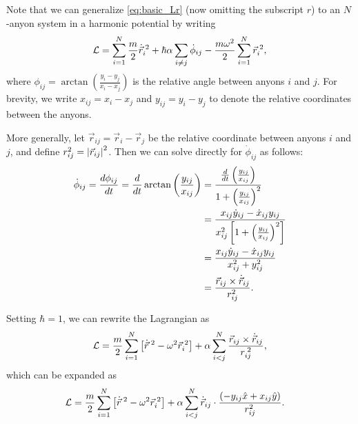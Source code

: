 Note that we can generalize \cref{eq:basic_Lr} (now omitting the subscript $r$) to an $N$-anyon system in a harmonic potential by writing
\begin{equation}
    \mathcal{L} = \sum_{i=1}^{N}\frac{m}{2}\dot{\vec{r}}_i^{\;2} + \hbar\alpha\sum_{i\neq j}\dot{\phi}_{ij} - \frac{m\omega^2}{2}\sum_{i=1}^{N}{\vec{r}_i}^{\;2},
\end{equation}
where $\phi_{ij} = \arctan\left( \frac{y_i-y_j}{x_i-x_j} \right)$ is the relative angle between anyons $i$ and $j$. For brevity, we write $x_{ij} = x_i-x_j$ and $y_{ij} = y_i-y_j$ to denote the relative coordinates between the anyons.

More generally, let $\vec{r}_{ij} = \vec{r}_i - \vec{r}_j$ be the relative coordinate between anyons $i$ and $j$, and define $r_{ij}^2 = \left|{\vec{r}_{ij}}\right|^2$. Then we can solve directly for $\dot{\phi}_{ij}$ as follows:
\begin{align*}
    \dot{\phi}_{ij} = \frac{d\phi_{ij}}{dt} = \frac{d}{dt}\arctan\left( \frac{y_{ij}}{x_{ij}} \right)
        &= \frac{\frac{d}{dt}\left( \frac{y_{ij}}{x_{ij}} \right)}{1+{\left( \frac{y_{ij}}{x_{ij}} \right)}^2} \\
        &= \frac{x_{ij}\dot{y}_{ij} - \dot{x}_{ij}y_{ij}}{x_{ij}^2\left[ 1+{\left( \frac{y_{ij}}{x_{ij}} \right)}^2 \right]} \\
        &= \frac{x_{ij}\dot{y}_{ij} - \dot{x}_{ij}y_{ij}}{x_{ij}^2 + y_{ij}^2} \\
        &= \frac{\vec{r}_{ij}\times\dot{\vec{r}}_{ij}}{r_{ij}^2}.
\end{align*}

Setting $\hbar=1$, we can rewrite the Lagrangian as~\cite{Date2003}
\begin{equation}
    \mathcal{L} = \frac{m}{2}\sum_{i=1}^{N}\left[ \dot{\vec{r}}^{\;2} - \omega^2\vec{r}_i^{\;2} \right] + \alpha\sum_{i<j}^{N}\frac{\vec{r}_{ij}\times\dot{\vec{r}}_{ij}}{{r}_{ij}^{\;2}},\label{eq:compact_L}
\end{equation}
which can be expanded as
\begin{align}
    \mathcal{L} &= \frac{m}{2}\sum_{i=1}^{N}\left[ \dot{\vec{r}}^{\;2} - \omega^2\vec{r}_i^{\;2} \right] + \alpha\sum_{i<j}^{N}\dot{\vec{r}}_{ij}\cdot\frac{\left( -y_{ij}\hat{x} + x_{ij}\hat{y} \right)}{r_{ij}^2}.\label{eq:L_with_A}
\end{align}


